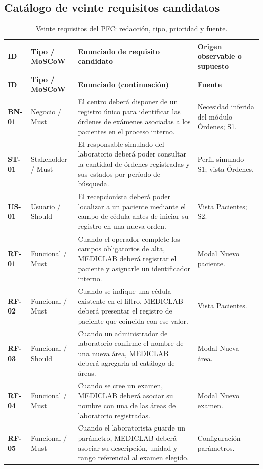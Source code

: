 \subsection{Catálogo de veinte requisitos candidatos}
\begingroup\footnotesize\setlength{\tabcolsep}{3.5pt}
\begin{longtable}{|p{1.3cm}|p{2.35cm}|p{7.3cm}|p{2.4cm}|}
\caption{Veinte requisitos del PFC: redacción, tipo, prioridad y fuente.}\label{tab:catalogo}\\\hline
\textbf{ID} & \textbf{Tipo / MoSCoW} & \textbf{Enunciado de requisito candidato} & \textbf{Origen observable o supuesto}\\\hline\endfirsthead
\hline\textbf{ID} & \textbf{Tipo / MoSCoW} & \textbf{Enunciado (continuación)} & \textbf{Fuente}\\\hline\endhead
\textbf{BN-01} & Negocio / Must & El centro deberá disponer de un registro único para identificar las órdenes de exámenes asociadas a los pacientes en el proceso interno. & Necesidad inferida del módulo Órdenes; S1.\\\hline
\textbf{ST-01} & Stakeholder / Must & El responsable simulado del laboratorio deberá poder consultar la cantidad de órdenes registradas y sus estados por período de búsqueda. & Perfil simulado S1; vista Órdenes.\\\hline
\textbf{US-01} & Usuario / Should & El recepcionista deberá poder localizar a un paciente mediante el campo de cédula antes de iniciar su registro en una nueva orden. & Vista Pacientes; S2.\\\hline
\textbf{RF-01} & Funcional / Must & Cuando el operador complete los campos obligatorios de alta, MEDICLAB deberá registrar el paciente y asignarle un identificador interno. & Modal Nuevo paciente.\\\hline
\textbf{RF-02} & Funcional / Must & Cuando se indique una cédula existente en el filtro, MEDICLAB deberá presentar el registro de paciente que coincida con ese valor. & Vista Pacientes.\\\hline
\textbf{RF-03} & Funcional / Should & Cuando un administrador de laboratorio confirme el nombre de una nueva área, MEDICLAB deberá agregarla al catálogo de áreas. & Modal Nueva área.\\\hline
\textbf{RF-04} & Funcional / Must & Cuando se cree un examen, MEDICLAB deberá asociar su nombre con una de las áreas de laboratorio registradas. & Modal Nuevo examen.\\\hline
\textbf{RF-05} & Funcional / Must & Cuando el laboratorista guarde un parámetro, MEDICLAB deberá asociar su descripción, unidad y rango referencial al examen elegido. & Configuración parámetros.\\\hline

\end{longtable}
